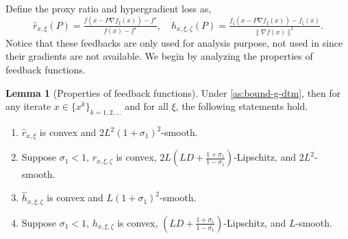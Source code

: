 \documentclass{article}
\theoremstyle{definition}
\newtheorem{lemma}[lemma]{Lemma}
\DeclareRobustCommand{\namerefc}[2]{\hyperref[#2]{\textcolor{#1}{\nameref*{#2}}}}
\newcommand{\osgd}{\namerefc{purple}{alg:sosgm}}
\begin{document}
Define the proxy ratio and hypergradient loss as,
\begin{equation}\label{eq:hat-r}
  \hat{r}_{x, \xi} (P) = \tfrac{f (x - P \nabla f_{\xi} (x)) -
   f^{\star}}{f (x) - f^{\star}},\quad 
   \hat{h}_{x, \xi, \zeta} (P) =
   \tfrac{f_{\zeta}  (x - P \nabla f_{\xi} (x)) - f_{\zeta}
   (x)}{\|\nabla f (x)\|^2}.
\end{equation}
Notice that these feedbacks are only used for analysis purpose, not used in {\osgd} since their gradients are not available. We begin by analyzing the properties of feedback functions.

\begin{lemma}[Properties of feedback functions]
  \label{lem:feedback-smoothness}
  Under \cref{as:bound-g-dtm}, then for any iterate $x \in \{x^k \}_{k = 1, 2, \ldots}$ and for all $\xi$, the following statements hold.
  \begin{enumerate}
    \item $\hat{r}_{x, \xi}$ is convex and $2 L^2 (1 + \sigma_1)^2$-smooth.
    
    \item Suppose $\sigma_1 < 1$, $r_{x, \xi, \zeta}$ is convex, $2 L
    \left( L D + \tfrac{1 + \sigma_1}{1 - \sigma_1} \right)$-Lipschitz, and $2
    L^2$-smooth.
    
    \item $\hat{h}_{x, \xi, \zeta}$ is convex and $L (1 + \sigma_1)^2$-smooth.
    
    \item Suppose $\sigma_1 < 1$, $h_{x, \xi, \zeta}$ is convex, $\left(
    L D + \tfrac{1 + \sigma_1}{1 - \sigma_1} \right)$-Lipschitz, and
    $L$-smooth.
  \end{enumerate}
\end{lemma}
\end{document}
